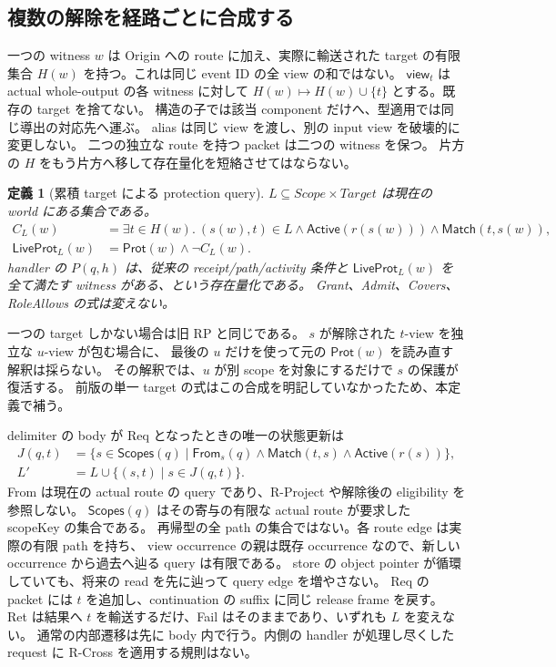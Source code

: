 \documentclass[11pt,a4paper]{article}
\newtheorem{definition}{定義}[section]
\newcommand{\Act}{\mathsf{Active}}
\begin{document}
\subsection{複数の解除を経路ごとに合成する}

一つの witness \(w\) は Origin への route に加え、実際に輸送された target の有限集合
\(H(w)\) を持つ。これは同じ event ID の全 view の和ではない。
\(\mathsf{view}_t\) は actual whole-output の各 witness に対して
\(H(w)\mapsto H(w)\cup\{t\}\) とする。既存の target を捨てない。
構造の子では該当 component だけへ、型適用では同じ導出の対応先へ運ぶ。
alias は同じ view を渡し、別の input view を破壊的に変更しない。
二つの独立な route を持つ packet は二つの witness を保つ。
片方の \(H\) をもう片方へ移して存在量化を短絡させてはならない。

\begin{definition}[累積 target による protection query]
\label{def:release-query}
\(L\subseteq Scope\times Target\) は現在の world にある集合である。
\[
\begin{split}
 C_L(w)&=\exists t\in H(w).\ (s(w),t)\in L
          \land\Act(r(s(w)))\land\mathsf{Match}(t,s(w)),\\
 \mathsf{LiveProt}_L(w)&=\mathsf{Prot}(w)\land\neg C_L(w).
\end{split}
\tag{R-Project}
\]
handler の \(P(q,h)\) は、従来の receipt/path/activity 条件と
\(\mathsf{LiveProt}_L(w)\) を全て満たす witness がある、という存在量化である。
Grant、Admit、Covers、RoleAllows の式は変えない。
\end{definition}

一つの target しかない場合は旧 RP と同じである。
\(s\) が解除された \(t\)-view を独立な \(u\)-view が包む場合に、
最後の \(u\) だけを使って元の \(\mathsf{Prot}(w)\) を読み直す解釈は採らない。
その解釈では、\(u\) が別 scope を対象にするだけで \(s\) の保護が復活する。
前版の単一 target の式はこの合成を明記していなかったため、本定義で補う。

delimiter の body が Req となったときの唯一の状態更新は
\[
\begin{split}
 J(q,t)&=\{s\in\mathsf{Scopes}(q)\mid\mathsf{From}_s(q)\land\mathsf{Match}(t,s)
                                      \land\Act(r(s))\},\\
 L'&=L\cup\{(s,t)\mid s\in J(q,t)\}.
\end{split}
\tag{R-Cross}
\]
From は現在の actual route の query であり、R-Project や解除後の eligibility を参照しない。
\(\mathsf{Scopes}(q)\) はその寄与の有限な actual route が要求した scopeKey の集合である。
再帰型の全 path の集合ではない。各 route edge は実際の有限 path を持ち、
view occurrence の親は既存 occurrence なので、新しい occurrence から過去へ辿る query は有限である。
store の object pointer が循環していても、将来の read を先に辿って query edge を増やさない。
Req の packet には \(t\) を追加し、continuation の suffix に同じ release frame を戻す。
Ret は結果へ \(t\) を輸送するだけ、Fail はそのままであり、いずれも \(L\) を変えない。
通常の内部遷移は先に body 内で行う。内側の handler が処理し尽くした request に
R-Cross を適用する規則はない。
\end{document}
